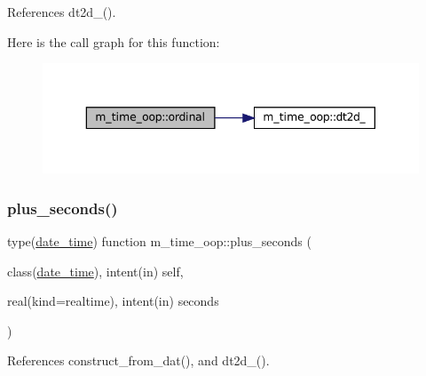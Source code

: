 References dt2d\+\_\+().

Here is the call graph for this function\+:\nopagebreak
\begin{figure}[H]
\begin{center}
\leavevmode
\includegraphics[width=343pt]{namespacem__time__oop_a7845f6da505dff53007df45b5c198081_cgraph}
\end{center}
\end{figure}
\mbox{\label{namespacem__time__oop_a6830c1cce303ec401ac8e4333a5a73d4}} 
\subsubsection{\texorpdfstring{plus\+\_\+seconds()}{plus\_seconds()}}
{\footnotesize\ttfamily type(\mbox{\hyperlink{structm__time__oop_1_1date__time}{date\+\_\+time}}) function m\+\_\+time\+\_\+oop\+::plus\+\_\+seconds (\begin{DoxyParamCaption}\item[{class(\mbox{\hyperlink{structm__time__oop_1_1date__time}{date\+\_\+time}}), intent(in)}]{self,  }\item[{real(kind=realtime), intent(in)}]{seconds }\end{DoxyParamCaption})\hspace{0.3cm}{\ttfamily [private]}}



References construct\+\_\+from\+\_\+dat(), and dt2d\+\_\+().

